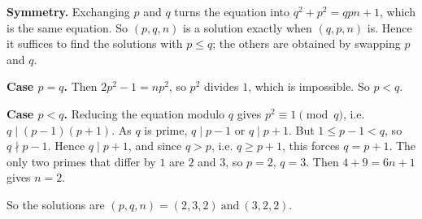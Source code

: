 \textbf{Symmetry.} Exchanging $p$ and $q$ turns the equation into $q^2+p^2=qpn+1$, which is the same equation. So $(p,q,n)$ is a solution exactly when $(q,p,n)$ is. Hence it suffices to find the solutions with $p\le q$; the others are obtained by swapping $p$ and $q$.

\textbf{Case $p=q$.} Then $2p^2-1=np^2$, so $p^2$ divides $1$, which is impossible. So $p<q$.

\textbf{Case $p<q$.} Reducing the equation modulo $q$ gives $p^2\equiv1\pmod q$, i.e. $q\mid(p-1)(p+1)$. As $q$ is prime, $q\mid p-1$ or $q\mid p+1$. But $1\le p-1<q$, so $q\nmid p-1$. Hence $q\mid p+1$, and since $q>p$, i.e. $q\ge p+1$, this forces $q=p+1$. The only two primes that differ by $1$ are $2$ and $3$, so $p=2$, $q=3$. Then $4+9=6n+1$ gives $n=2$.

So the solutions are $\boxed{(p,q,n)=(2,3,2)\ \text{and}\ (3,2,2)}$.
